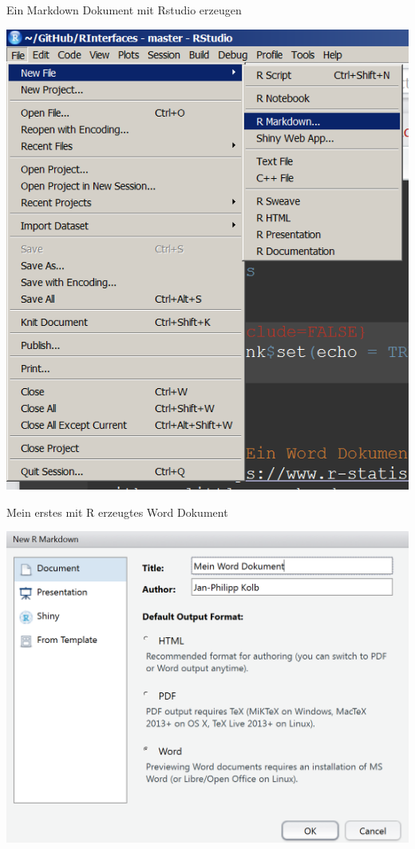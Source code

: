 \documentclass[ignorenonframetext,]{beamer}
\begin{document}
\begin{frame}{Ein Markdown Dokument mit Rstudio erzeugen}

\includegraphics{./tex2pdf.956/5d3751200afa25066a5dc8f2f69512aee7f6bcff.png}

\end{frame}

\begin{frame}{Mein erstes mit R erzeugtes Word Dokument}

\includegraphics{./tex2pdf.956/7a7960c7cb6511f9b21b065a6e95f68208ce6f5c.png}

\end{frame}
\end{document}
